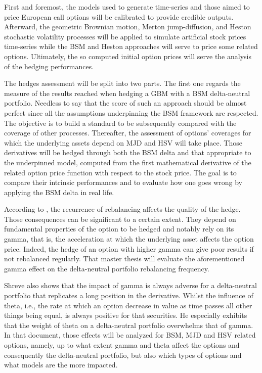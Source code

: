 \documentclass[12pt]{report}
\begin{document}
First and foremost, the models used to generate time-series and those aimed to price European call options will be calibrated to provide credible outputs.
Afterward, the geometric Brownian motion, Merton jump-diffusion, and Heston stochastic volatility processes will be applied to simulate artificial stock prices time-series while the BSM and Heston approaches will serve to price some related options.
Ultimately, the so computed initial option prices will serve the analysis of the hedging performances.

The hedges assessment will be split into two parts. 
The first one regards the measure of the results reached when hedging a GBM with a BSM delta-neutral portfolio.  Needless to say that the score of such an approach should be almost perfect since all the assumptions underpinning the BSM framework are respected.
The objective is to build a standard to be subsequently compared with the coverage of other processes.
Thereafter, the assessment of options' coverages for which the underlying assets depend on MJD and HSV will take place.
Those derivatives will be hedged through both the BSM delta and that appropriate to the underpinned model, computed from the first mathematical derivative of the related option price function with respect to the stock price.
The goal is to compare their intrinsic performances and to evaluate how one goes wrong by applying the BSM delta in real life. 

According to \citet{shreve}, the recurrence of rebalancing affects the quality of the hedge. 
Those consequences can be significant to a certain extent.
They depend on fundamental properties of the option to be hedged and notably rely on its gamma, that is, the acceleration at which the underlying asset affects the option price.
Indeed, the hedge of an option with higher gamma can give poor results if not rebalanced regularly.
That master thesis will evaluate the aforementioned gamma effect on the delta-neutral portfolio rebalancing frequency.

Shreve also shows that the impact of gamma is always adverse for a delta-neutral portfolio that replicates a long position in the derivative. 
Whilst the influence of theta, i.e., the rate at which an option decrease in value as time passes all other things being equal, is always positive for that securities.
He especially exhibits that the weight of theta on a delta-neutral portfolio overwhelms that of gamma. 
In that document, those effects will be analyzed for BSM, MJD and HSV related options, namely, up to what extent gamma and theta affect the options and consequently the delta-neutral portfolio, but also which types of options and what models are the more impacted.
\end{document}
